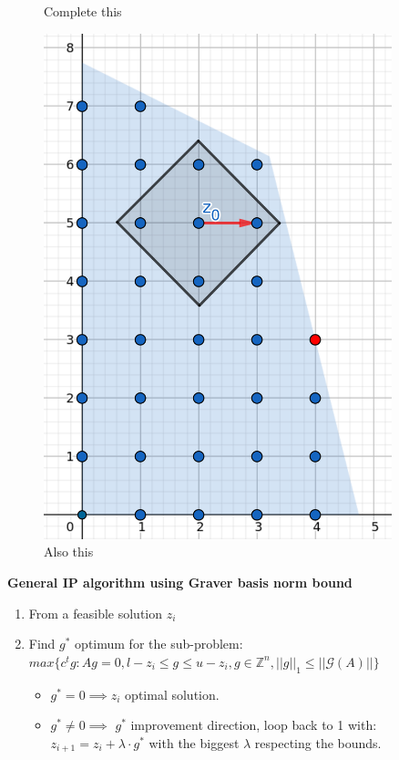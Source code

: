 \begin{figure}[h]
\begin{minipage}[b]{0.45\textwidth}
    \caption{Complete this}
\end{minipage}
\hfill
\begin{minipage}[b]{0.45\textwidth}
    \centering
    \includegraphics[width=0.9\textwidth]{images/IP(6).png}
    \caption{Also this}
\end{minipage}
\end{figure}

\newpage
\textbf{General IP algorithm using Graver basis norm bound}
\vspace{-8pt}
\begin{enumerate}
    \item From a feasible solution $z_i$
    \item Find $g^*$ optimum for the sub-problem: \vspace{4pt}\\
          $max\{c^tg : Ag = 0, l-z_i \leq g \leq u-z_i, g \in \mathbb{Z}^n, ||g||_1 \leq ||\mathcal{G}(A)|| \}$ \vspace{4pt}
    \begin{itemize}
        \item $g^* = 0 \implies z_i$ optimal solution.
        \item $g^* \neq 0 \implies$ $g^*$ improvement direction, loop back to 1 with:\\
        $z_{i+1} = z_i + \lambda \cdot g^*$ with the biggest $\lambda$ respecting the bounds.
    \end{itemize}
\end{enumerate}



